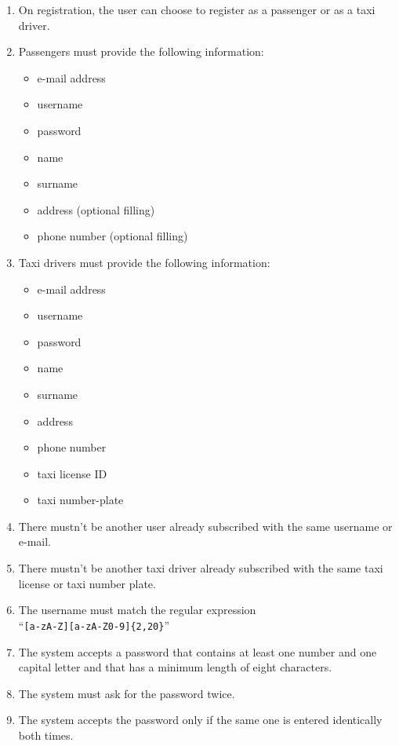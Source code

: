 \begin{enumerate}
    \item On registration, the user can choose to register as a passenger or as a taxi driver.
    \item Passengers must provide the following information:
    \begin{itemize}
        \item e-mail address
        \item username
        \item password
        \item name
        \item surname
        \item address (optional filling)
        \item phone number (optional filling)
    \end{itemize}
    \item Taxi drivers must provide the following information:
    \begin{itemize}
        \item e-mail address
        \item username
        \item password
        \item name
        \item surname
        \item address
        \item phone number
        \item taxi license ID
        \item taxi number-plate
    \end{itemize}
    \item There mustn't be another user already subscribed with the same username or e-mail. \label{f-sameInfo}
      \item There mustn't be another taxi driver already subscribed with the same taxi license or taxi number plate. \label{f-sameTaxi}
    \item The username must match the regular expression\\``\texttt{[a-zA-Z][a-zA-Z0-9]\{2,20\}}''    \label{f-usrn}
    \item The system accepts a password that contains at least one number and one capital letter and that has a minimum length of eight characters.  \label{f-psw1}
    \item The system must ask for the password twice.
    \item The system accepts the password only if the same one is entered identically both times. \label{f-psw2}

\end{enumerate}
